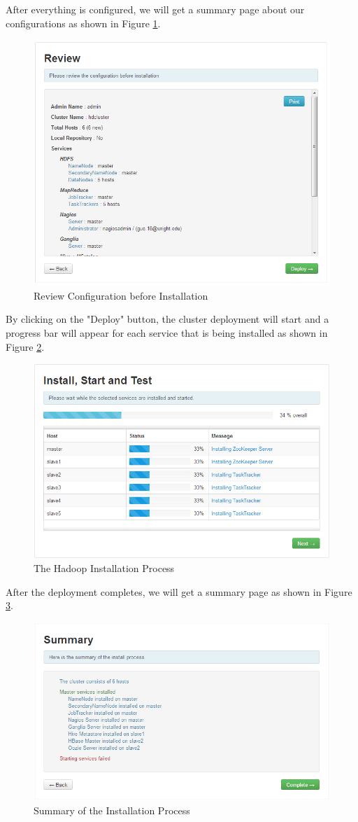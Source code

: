 After everything is configured, we will get a summary page about our configurations as shown in Figure \ref{fig:config.review}.
\begin{figure}[ht]
  \centering
  \includegraphics[width=.8\textwidth]{figs/5163os_06_22.png}
  \caption{Review Configuration before Installation}\label{fig:config.review}
\end{figure} 
By clicking on the "Deploy" button, the cluster deployment will start and a progress bar will appear for each service that is being installed as shown in Figure \ref{fig:hadoop.install.process}.
\begin{figure}[ht]
  \centering
  \includegraphics[width=.8\textwidth]{figs/5163os_06_24.png}
  \caption{The Hadoop Installation Process}\label{fig:hadoop.install.process}
\end{figure} 
After the deployment completes, we will get a summary page as shown in Figure \ref{fig:install.summary}.
\begin{figure}[ht]
  \centering
  \includegraphics[width=.8\textwidth]{figs/5163os_06_26.png}
  \caption{Summary of the Installation Process}\label{fig:install.summary}
\end{figure} 
